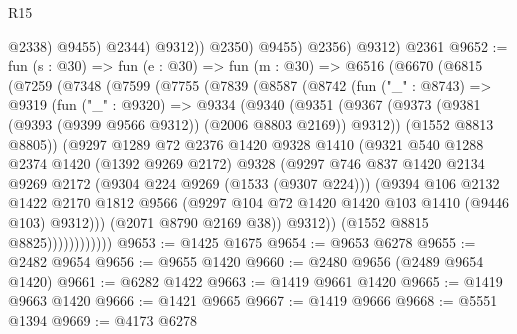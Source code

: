 \begin{lexlean}{R15}
\begin{coremodule}
                      @2338)
                    @9455)
                  @2344)
                @9312))
            @2350)
          @9455)
        @2356)
      @9312)
    @2361
@9652 := fun (s : @30) =>
  fun (e : @30) =>
  fun (m : @30) =>
  @6516
    (@6670
      (@6815
        (@7259
          (@7348
            (@7599
              (@7755
                (@7839
                  (@8587
                    (@8742
                      (fun ("_" : @8743) =>
                      @9319
                        (fun ("_" : @9320) =>
                        @9334
                          (@9340
                            (@9351
                              (@9367
                                (@9373
                                  (@9381 (@9393 (@9399 @9566 @9312)) (@2006 @8803 @2169))
                                  @9312))
                              (@1552 @8813 @8805))
                            (@9297
                              @1289
                              @72
                              @2376
                              @1420
                              @9328
                              @1410
                              (@9321
                                @540
                                @1288
                                @2374
                                @1420
                                (@1392 @9269 @2172)
                                @9328
                                (@9297
                                  @746
                                  @837
                                  @1420
                                  @2134
                                  @9269
                                  @2172
                                  (@9304 @224 @9269 (@1533 (@9307 @224)))
                                  (@9394
                                    @106
                                    @2132
                                    @1422
                                    @2170
                                    @1812
                                    @9566
                                    (@9297 @104 @72 @1420 @1420 @103 @1410 (@9446 @103) @9312)))
                                (@2071 @8790 @2169 @38))
                              @9312))
                          (@1552 @8815 @8825))))))))))))
@9653 := @1425 @1675
@9654 := @9653 @6278
@9655 := @2482 @9654
@9656 := @9655 @1420
@9660 := @2480 @9656 (@2489 @9654 @1420)
@9661 := @6282 @1422
@9663 := @1419 @9661 @1420
@9665 := @1419 @9663 @1420
@9666 := @1421 @9665
@9667 := @1419 @9666
@9668 := @5551 @1394
@9669 := @4173 @6278

\end{coremodule}
\end{lexlean}
